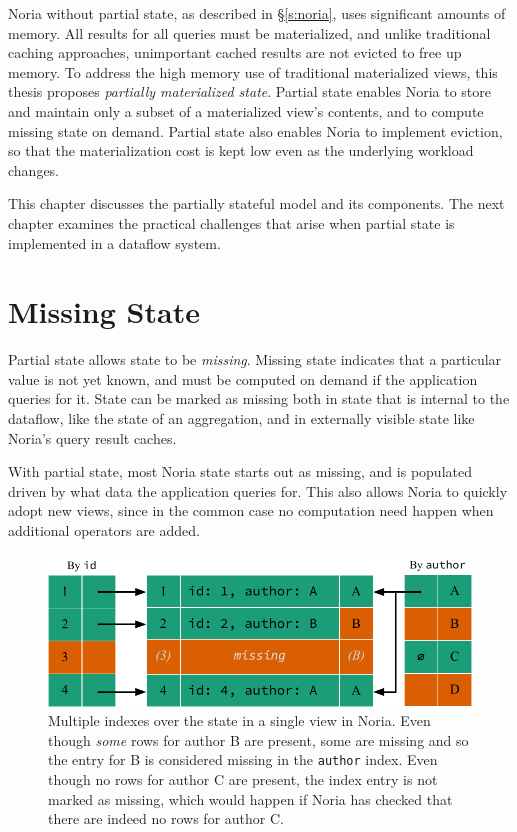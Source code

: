 Noria without partial state, as described in \S\ref{s:noria}, uses significant
amounts of memory. All results for all queries must be materialized, and unlike
traditional caching approaches, unimportant cached results are not evicted to
free up memory. To address the high memory use of traditional materialized
views, this thesis proposes \textit{partially materialized state}. Partial state
enables Noria to store and maintain only a subset of a materialized view's
contents, and to compute missing state on demand. Partial state also enables
Noria to implement eviction, so that the materialization cost is kept low even
as the underlying workload changes.

This chapter discusses the partially stateful model and its components. The next
chapter examines the practical challenges that arise when partial state is
implemented in a dataflow system.

\section{Missing State}
\label{s:missing}

Partial state allows state to be \textit{missing}. Missing state indicates that
a particular value is not yet known, and must be computed on demand if the
application queries for it. State can be marked as missing both in state that is
internal to the dataflow, like the state of an aggregation, and in externally
visible state like Noria's query result caches.

With partial state, most Noria state starts out as missing, and is populated
driven by what data the application queries for. This also allows Noria to
quickly adopt new views, since in the common case no computation need happen
when additional operators are added.

\begin{figure}
  \centering
  \includegraphics{diagrams/Indexing.pdf}
  \caption{Multiple indexes over the state in a single view in Noria. Even
  though \emph{some} rows for author B are present, some are missing and so the
  entry for B is considered missing in the \texttt{author} index. Even though no
  rows for author C are present, the index entry is not marked as missing, which
  would happen if Noria has checked that there are indeed no rows for
  author C.}
  \label{f:indexing}
\end{figure}

